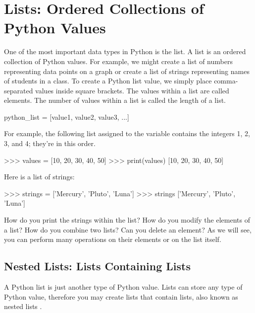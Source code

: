 \documentclass[11pt]{cselabheader}
\begin{document}
\vspace{-1.5em}
\tableofcontents

\newpage
{}

\section{Lists: Ordered Collections of Python Values}

One of the most important data types in Python is the list. A list is an ordered
collection of Python values. For example, we might create a list of numbers
representing data points on a graph or create a list of strings representing
names of students in a class. To create a Python list value, we simply
place comma-separated values inside square brackets.
The values within a list are called elements.
The number of values within a list is called the length of a list.

\begin{python3code}
python_list = [value1, value2, value3, ...]
\end{python3code}

For example, the following list assigned to the variable 
contains the integers 1, 2, 3, and 4; they're in this order.

\begin{pyconcode}
>>> values = [10, 20, 30, 40, 50]
>>> print(values)
[10, 20, 30, 40, 50]

\end{pyconcode}

Here is a list of strings:

\begin{pyconcode}
>>> strings = ['Mercury', 'Pluto', 'Luna']
>>> strings
['Mercury', 'Pluto', 'Luna']

\end{pyconcode}

How do you print the strings within the list? How do you modify the
elements of a list? How do you combine two lists? Can you delete an element?
As we will see, you can perform many operations on their elements or on the list itself.


\subsection{Nested Lists: Lists Containing Lists}

A Python list is just another type of Python value.
Lists can store any type of Python value, therefore you
may create lists that contain lists, also known as
nested lists .
\end{document}
